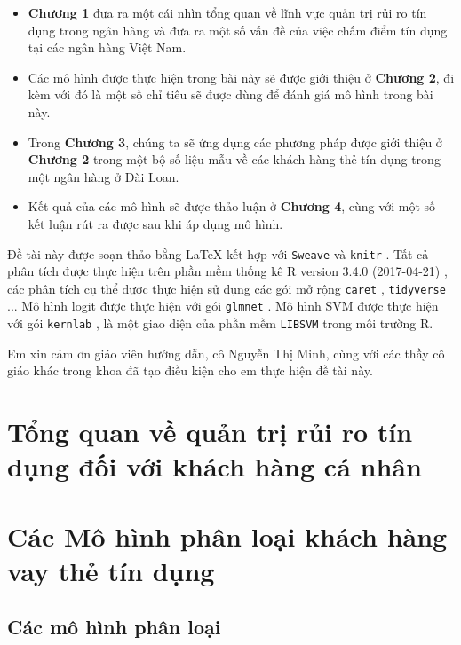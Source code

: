 \documentclass[a4paper]{report}\usepackage[]{graphicx}\usepackage[]{color}
\begin{document}
\begin{itemize}
\item \textbf{Chương 1} đưa ra một cái nhìn tổng quan về lĩnh vực quản trị rủi ro tín dụng trong ngân hàng và đưa ra một số vấn đề của việc chấm điểm tín dụng tại các ngân hàng Việt Nam.
\item Các mô hình được thực hiện trong bài này sẽ được giới thiệu ở \textbf{Chương 2}, đi kèm với đó là một số chỉ tiêu sẽ được dùng để đánh giá mô hình trong bài này.
\item Trong \textbf{Chương 3}, chúng ta sẽ ứng dụng các phương pháp được giới thiệu ở \textbf{Chương 2} trong một bộ số liệu mẫu về các khách hàng thẻ tín dụng trong một ngân hàng ở Đài Loan.
\item Kết quả của các mô hình sẽ được thảo luận ở \textbf{Chương 4}, cùng với một số kết luận rút ra được sau khi áp dụng mô hình.
\end{itemize}

Đề tài này được soạn thảo bằng \LaTeX{} kết hợp với \texttt{Sweave} và \texttt{knitr} 
\parencite{r:knitr}. Tất cả phân tích được thực hiện trên phần mềm thống kê 
R version 3.4.0 (2017-04-21) \parencite{r:rbase},  
các phân tích cụ thể được thực hiện sử dụng các gói mở rộng \texttt{caret} \parencite{r:caret}, \texttt{tidyverse} \parencite{r:tidyverse}... Mô hình logit được thực hiện với gói \texttt{glmnet} \parencite{r:glmnet}. 
Mô hình SVM được thực hiện với gói \texttt{kernlab} \parencite{r:kernlab}, là một giao diện của phần mềm \texttt{LIBSVM} \parencite{CC01a} trong môi trường R.

Em xin cảm ơn giáo viên hướng dẫn, cô Nguyễn Thị Minh, cùng với các thầy cô giáo khác trong khoa đã tạo điều kiện cho em thực hiện đề tài này.


\chapter{Tổng quan về quản trị rủi ro tín dụng đối với khách hàng cá nhân}



\chapter{Các Mô hình phân loại khách hàng vay thẻ tín dụng}
\section{Các mô hình phân loại}
\end{document}
